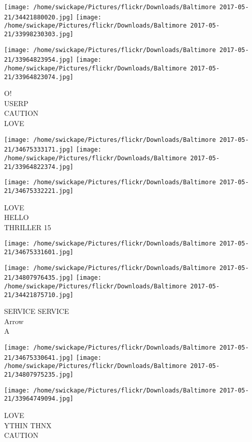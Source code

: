 \documentclass[10pt,letterpaper]{article}
\begin{document}
\texttt{[image: /home/swickape/Pictures/flickr/Downloads/Baltimore 2017-05-21/34421880020.jpg]}
\texttt{[image: /home/swickape/Pictures/flickr/Downloads/Baltimore 2017-05-21/33998230303.jpg]}

\texttt{[image: /home/swickape/Pictures/flickr/Downloads/Baltimore 2017-05-21/33964823954.jpg]}
\texttt{[image: /home/swickape/Pictures/flickr/Downloads/Baltimore 2017-05-21/33964823074.jpg]}

O!\\
USERP\\
CAUTION\\
LOVE\\
\pagebreak

\texttt{[image: /home/swickape/Pictures/flickr/Downloads/Baltimore 2017-05-21/34675333171.jpg]}
\texttt{[image: /home/swickape/Pictures/flickr/Downloads/Baltimore 2017-05-21/33964822374.jpg]}

\texttt{[image: /home/swickape/Pictures/flickr/Downloads/Baltimore 2017-05-21/34675332221.jpg]}

LOVE\\
HELLO\\
THRILLER 15\\
\pagebreak

\texttt{[image: /home/swickape/Pictures/flickr/Downloads/Baltimore 2017-05-21/34675331601.jpg]}

\vspace{0.25in}
\texttt{[image: /home/swickape/Pictures/flickr/Downloads/Baltimore 2017-05-21/34807976435.jpg]}
\texttt{[image: /home/swickape/Pictures/flickr/Downloads/Baltimore 2017-05-21/34421875710.jpg]}

SERVICE SERVICE\\
Arrow\\
A\\
\pagebreak

\texttt{[image: /home/swickape/Pictures/flickr/Downloads/Baltimore 2017-05-21/34675330641.jpg]}
\texttt{[image: /home/swickape/Pictures/flickr/Downloads/Baltimore 2017-05-21/34807975235.jpg]}

\vspace{0.25in}
\texttt{[image: /home/swickape/Pictures/flickr/Downloads/Baltimore 2017-05-21/33964749094.jpg]}

LOVE\\
YTHIN THNX\\
CAUTION\\
\pagebreak
\end{document}
